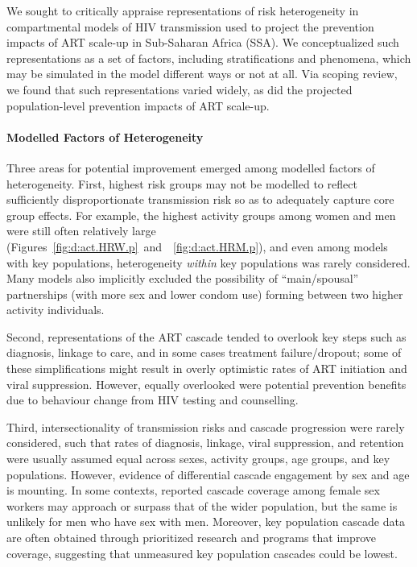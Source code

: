 We sought to critically appraise representations of risk heterogeneity
in compartmental models of HIV transmission used to
project the prevention impacts of ART scale-up in Sub-Saharan Africa (SSA).
We conceptualized such representations as a set of factors,
including stratifications and phenomena,
which may be simulated in the model different ways or not at all.
Via scoping review, we found that such representations varied widely,
as did the projected population-level prevention impacts of ART scale-up.
\paragraph{Modelled Factors of Heterogeneity}
Three areas for potential improvement emerged among modelled factors of heterogeneity.
First, highest risk groups may not be modelled to reflect
sufficiently disproportionate transmission risk so as to adequately
capture core group effects.
For example, the highest activity groups among women and men were still often relatively large
(Figures~\ref{fig:d:act.HRW.p}~and~~\ref{fig:d:act.HRM.p}),
and even among models with key populations,
heterogeneity \emph{within} key populations was rarely considered.
Many models also implicitly excluded the possibility of
``main/spousal'' partnerships (with more sex and lower condom use)
forming between two higher activity individuals.
\par
Second, representations of the ART cascade tended to overlook
key steps such as diagnosis, linkage to care, and in some cases treatment failure/dropout;
\cite{Mountain2014a}
some of these simplifications might result in
overly optimistic rates of ART initiation and viral suppression.
However, equally overlooked were potential prevention benefits
due to behaviour change from HIV testing and counselling.
\par
Third, intersectionality of transmission risks and cascade progression were rarely considered,
such that rates of diagnosis, linkage, viral suppression, and retention
were usually assumed equal across sexes, activity groups, age groups, and key populations.
However, evidence of differential cascade engagement by sex and age is mounting.
\cite{Witzel2017,Mayanja2018,Green2020}
In some contexts, reported cascade coverage among female sex workers
may approach or surpass that of the wider population,\cite{Mountain2014,Hakim2018}
but the same is unlikely for men who have sex with men.\cite{Mountain2014,Stannah2019}
Moreover, key population cascade data are often obtained through
prioritized research and programs that improve coverage,
suggesting that unmeasured key population cascades could be lowest.\cite{Mountain2014}
